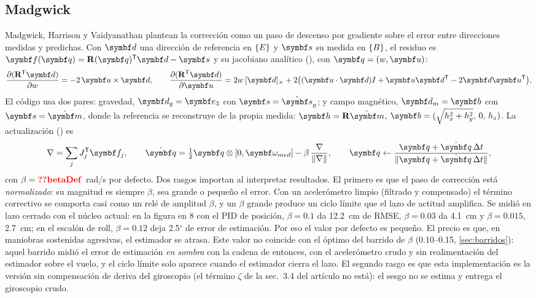 \subsection{Madgwick}

Madgwick, Harrison y Vaidyanathan \cite{madgwick11} plantean la corrección
como un paso de descenso por gradiente sobre el error entre direcciones
medidas y predichas. Con $\vect d$ una dirección de referencia en $\{E\}$ y
$\vect s$ su medida en $\{B\}$, el residuo es $\vect f(\vect q)=\R(\vect q)\T\vect d-\vect s$
y su jacobiano analítico (), con $\vect q=(w,\vect u)$:
\begin{equation}
\frac{\partial(\R\T\vect d)}{\partial w}=-2\,\vect u\times\vect d,\qquad
\frac{\partial(\R\T\vect d)}{\partial\vect u}=2w\,\sk{\vect d}+2\big((\vect u\cdot\vect d)I+\vect u\vect d\T-2\vect d\vect u\T\big).
\label{eq:jacmad}
\end{equation}
El código usa dos pares: gravedad, $\vect d_g=\eu$ con $\vect s=\hat{\vect s}_g$;
y campo magnético, $\vect d_m=\vect b$ con $\vect s=\hat{\vect m}$, donde la
referencia se reconstruye de la propia medida:
$\vect h=\R\hat{\vect m}$, $\vect b=(\sqrt{h_x^2+h_y^2},\,0,\,h_z)$. La
actualización () es
\begin{equation}
\nabla=\sum_j J_j\T\vect f_j,\qquad
\dot{\vect q}=\tfrac12\vect q\otimes[0,\vect\omega_{med}]-\beta\,\frac{\nabla}{\|\nabla\|},\qquad
\vect q\leftarrow\frac{\vect q+\dot{\vect q}\,\Delta t}{\|\vect q+\dot{\vect q}\,\Delta t\|},
\label{eq:madgwick}
\end{equation}
con $\beta=\val{betaDef}$~rad/s por defecto. Dos rasgos importan al
interpretar resultados. El primero es que el paso de corrección está
\emph{normalizado}: su magnitud es siempre $\beta$, sea grande o pequeño el
error. Con un acelerómetro limpio (filtrado y compensado) el término
correctivo se comporta casi como un relé de amplitud $\beta$, y un $\beta$
grande produce un ciclo límite que el lazo de actitud amplifica. Se midió en
lazo cerrado con el núcleo actual: en la figura en 8
con el PID de posición, $\beta=0.1$ da 12.2~cm de RMSE, $\beta=0.03$ da
4.1~cm y $\beta=0.015$, 2.7~cm; en el escalón de roll, $\beta=0.12$ deja
2.5$^\circ$ de error de estimación. Por eso el valor por defecto es pequeño.
El precio es que, en maniobras sostenidas agresivas, el estimador se
atrasa. Este valor no coincide con el óptimo del barrido de $\beta$
(0.10--0.15, \cref{sec:barridos}): aquel barrido midió el error de
estimación \emph{en sombra} con la cadena de entonces, con el acelerómetro
crudo y sin realimentación del estimador sobre el vuelo, y el ciclo límite
solo aparece cuando el estimador cierra el lazo. El segundo rasgo es que esta implementación es la
versión sin compensación de deriva del giroscopio (el término $\zeta$ de la
sec.~3.4 del artículo no está): el sesgo no se estima y 
entrega el giroscopio crudo.

